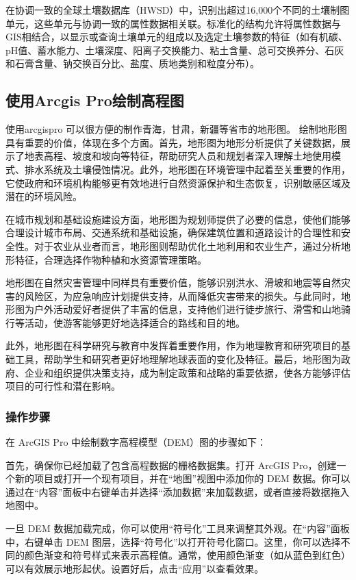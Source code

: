\documentclass{article}
\begin{document}
	在协调一致的全球土壤数据库（HWSD）中，识别出超过16,000个不同的土壤制图单元，这些单元与协调一致的属性数据相关联。标准化的结构允许将属性数据与GIS相结合，以显示或查询土壤单元的组成以及选定土壤参数的特征（如有机碳、pH值、蓄水能力、土壤深度、阳离子交换能力、粘土含量、总可交换养分、石灰和石膏含量、钠交换百分比、盐度、质地类别和粒度分布）。
		
	\subsection{使用Arcgis Pro绘制高程图}

使用arcgispro 可以很方便的制作青海，甘肃，新疆等省市的地形图。
绘制地形图具有重要的价值，体现在多个方面。首先，地形图为地形分析提供了关键数据，展示了地表高程、坡度和坡向等特征，帮助研究人员和规划者深入理解土地使用模式、排水系统及土壤侵蚀情况。此外，地形图在环境管理中起着至关重要的作用，它使政府和环境机构能够更有效地进行自然资源保护和生态恢复，识别敏感区域及潜在的环境风险。

在城市规划和基础设施建设方面，地形图为规划师提供了必要的信息，使他们能够合理设计城市布局、交通系统和基础设施，确保建筑位置和道路设计的合理性和安全性。对于农业从业者而言，地形图则帮助优化土地利用和农业生产，通过分析地形特征，合理选择作物种植和水资源管理策略。

地形图在自然灾害管理中同样具有重要价值，能够识别洪水、滑坡和地震等自然灾害的风险区，为应急响应计划提供支持，从而降低灾害带来的损失。与此同时，地形图为户外活动爱好者提供了丰富的信息，支持他们进行徒步旅行、滑雪和山地骑行等活动，使游客能够更好地选择适合的路线和目的地。

此外，地形图在科学研究与教育中发挥着重要作用，作为地理教育和研究项目的基础工具，帮助学生和研究者更好地理解地球表面的变化及特征。最后，地形图为政府、企业和组织提供决策支持，成为制定政策和战略的重要依据，使各方能够评估项目的可行性和潜在影响。

		\subsubsection{操作步骤}
		在 ArcGIS Pro 中绘制数字高程模型（DEM）图的步骤如下：
		
		首先，确保你已经加载了包含高程数据的栅格数据集。打开 ArcGIS Pro，创建一个新的项目或打开一个现有项目，并在“地图”视图中添加你的 DEM 数据。你可以通过在“内容”面板中右键单击并选择“添加数据”来加载数据，或者直接将数据拖入地图中。
		
		一旦 DEM 数据加载完成，你可以使用“符号化”工具来调整其外观。在“内容”面板中，右键单击 DEM 图层，选择“符号化”以打开符号化窗口。这里，你可以选择不同的颜色渐变和符号样式来表示高程值。通常，使用颜色渐变（如从蓝色到红色）可以有效展示地形起伏。设置好后，点击“应用”以查看效果。
		
\end{document}
